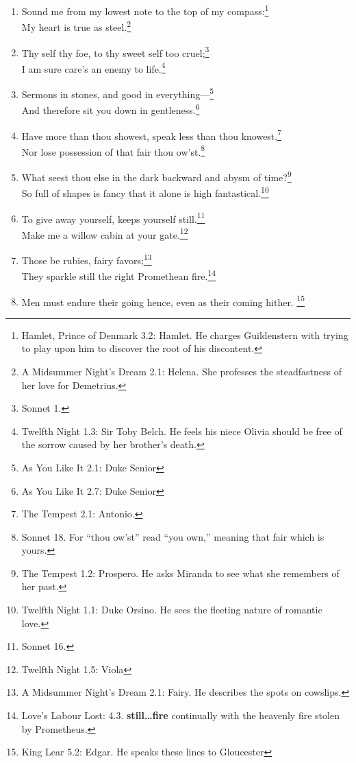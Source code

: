 \documentclass[17pt,twoside]{extarticle}
\begin{document}
\begin{enumerate}
  the bettering of my mind.\footnote{The Tempest 1.2: Prospero.}
\item
  Sound me from my lowest note to the top of my compass:\footnote{Hamlet,
    Prince of Denmark 3.2: Hamlet. He charges Guildenstern with trying
    to play upon him to discover the root of his discontent.}\\My heart
  is true as steel.\footnote{A Midsummer Night's Dream 2.1: Helena. She
    professes the steadfastness of her love for Demetrius.}
\item
  Thy self thy foe, to thy sweet self too cruel;\footnote{Sonnet 1.}\\I
  am sure care's an enemy to life.\footnote{Twelfth Night 1.3: Sir Toby
    Belch. He feels his niece Olivia should be free of the sorrow caused
    by her brother's death.}
\item
  Sermons in stones, and good in everything---\footnote{As You Like It
    2.1: Duke Senior}\\And therefore sit you down in
  gentleness.\footnote{As You Like It 2.7: Duke Senior}
\item
  Have more than thou showest, speak less than thou knowest,\footnote{The
    Tempest 2.1: Antonio.}\\Nor lose possession of that fair thou
  ow'st.\footnote{Sonnet 18. For ``thou ow'st'' read ``you own,''
    meaning that fair which is yours.}
\item
  What seest thou else in the dark backward and abysm of time?\footnote{The
    Tempest 1.2: Prospero. He asks Miranda to see what she remembers of
    her past.}\\So full of shapes is fancy that it alone is high
  fantastical.\footnote{Twelfth Night 1.1: Duke Orsino. He sees the
    fleeting nature of romantic love.}
\item
  To give away yourself, keeps yourself still.\footnote{Sonnet 16.}\\Make
  me a willow cabin at your gate.\footnote{Twelfth Night 1.5: Viola}
\item
  Those be rubies, fairy favors;\footnote{A Midsummer Night's Dream 2.1:
    Fairy. He describes the spots on cowslips.}\\They sparkle still the
  right Promethean fire.\footnote{Love's Labour Lost: 4.3.
    \textbf{still\ldots{}fire} continually with the heavenly fire stolen
    by Prometheus.}
\item
  Men must endure their going hence, even as their coming hither.
  \footnote{King Lear 5.2: Edgar. He speaks these lines to Gloucester
}
\end{enumerate}
\end{document}
